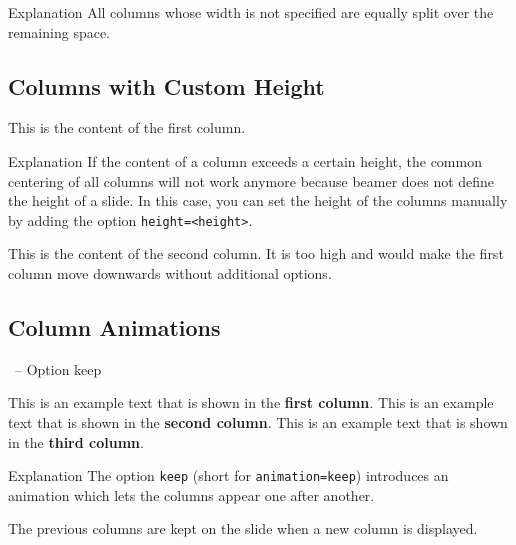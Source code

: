 \documentclass[
	aspectratio=169, %
	8pt, %
]{beamer}
\begin{document}
{\begin{frame}{\insertsubsection}
\begin{note}{Explanation}
		All columns whose width is not specified are equally split over the remaining space.
	\end{note}
\end{frame}

\subsection{Columns with Custom Height}
\begin{frame}{\insertsubsection}
	\begin{mycolumns}[height=6cm]
		\begin{example}{}
			This is the content of the first column.
		\end{example}
		\begin{note}{Explanation}
			If the content of a column exceeds a certain height, the common centering of all columns will not work anymore because beamer does not define the height of a slide. In this case, you can set the height of the columns manually by adding the option \texttt{height=<height>}.
		\end{note}
	\mynextcolumn
		\begin{example}{}
			This is the content of the second column. It is too high and would make the first column move downwards without additional options.
			\vspace{80mm}
		\end{example}
	\end{mycolumns}	
\end{frame}

\subsection{Column Animations}
\begin{frame}{\insertsubsection\ -- Option keep}
	\begin{mycolumns}[columns=3,keep] %
		This is an example text that is shown in the \textbf{first column}.
	\mynextcolumn
		This is an example text that is shown in the \textbf{second column}.
	\mynextcolumn
		This is an example text that is shown in the \textbf{third column}.
	\end{mycolumns}
	\vfill
	\begin{note}{Explanation}
		The option \texttt{keep} (short for \texttt{animation=keep}) introduces an animation which lets the columns appear one after another.

		The previous columns are kept on the slide when a new column is displayed.


\end{note}
\end{frame}}
\end{document}
